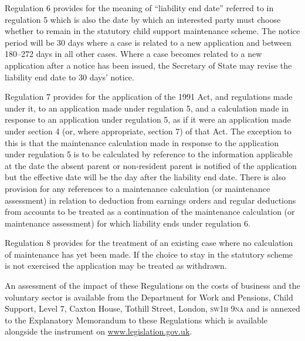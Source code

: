 \documentclass[12pt,a4paper]{article}
\begin{document}
Regulation 6 provides for the meaning of “liability end date” referred to in regulation 5 which is also the date by which an interested party must choose whether to remain in the statutory child support maintenance scheme. The notice period will be 30 days where a case is related to a new application and between 180--272 days in all other cases. Where a case becomes related to a new application after a notice has been issued, the Secretary of State may revise the liability end date to 30 days’ notice.

Regulation 7 provides for the application of the 1991 Act, and regulations made under it, to an application made under regulation 5, and a calculation made in response to an application under regulation 5, as if it were an application made under section 4 (or, where appropriate, section 7) of that Act. The exception to this is that the maintenance calculation made in response to the application under regulation 5 is to be calculated by reference to the information applicable at the date the absent parent or non-resident parent is notified of the application but the effective date will be the day after the liability end date. There is also provision for any references to a maintenance calculation (or maintenance assessment) in relation to deduction from earnings orders and regular deductions from accounts to be treated as a continuation of the maintenance calculation (or maintenance assessment) for which liability ends under regulation 6.

Regulation 8 provides for the treatment of an existing case where no calculation of maintenance has yet been made. If the choice to stay in the statutory scheme is not exercised the application may be treated as withdrawn.

An assessment of the impact of these Regulations on the costs of business and the voluntary sector is available from the Department for Work and Pensions, Child Support, Level 7, Caxton House, Tothill Street, London, \textsc{\lowercase{SW1H 9NA}} and is annexed to the Explanatory Memorandum to these Regulations which is available alongside the instrument on \url{www.legislation.gov.uk}. 
\end{document}
